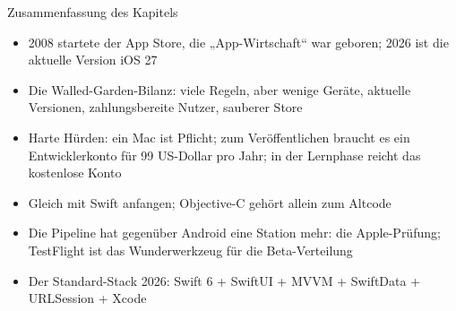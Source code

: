 \begin{tcbsummary}{Zusammenfassung des Kapitels}
\begin{itemize}
  \item 2008 startete der App Store, die „App-Wirtschaft“ war geboren; 2026 ist die aktuelle Version iOS 27
  \item Die Walled-Garden-Bilanz: viele Regeln, aber wenige Geräte, aktuelle Versionen, zahlungsbereite Nutzer, sauberer Store
  \item Harte Hürden: ein Mac ist Pflicht; zum Veröffentlichen braucht es ein Entwicklerkonto für 99 US-Dollar pro Jahr; in der Lernphase reicht das kostenlose Konto
  \item Gleich mit Swift anfangen; Objective-C gehört allein zum Altcode
  \item Die Pipeline hat gegenüber Android eine Station mehr: die Apple-Prüfung; TestFlight ist das Wunderwerkzeug für die Beta-Verteilung
  \item Der Standard-Stack 2026: Swift 6 + SwiftUI + MVVM + SwiftData + URLSession + Xcode
\end{itemize}

\end{tcbsummary}
